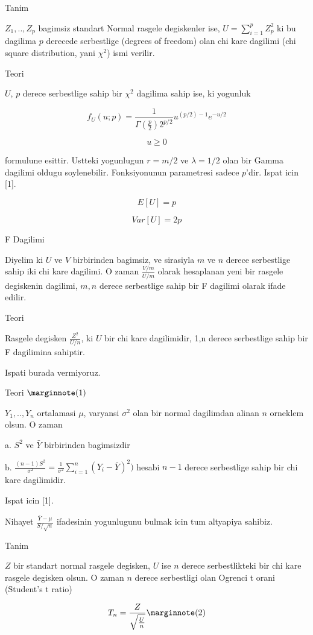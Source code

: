 \documentclass[12pt,fleqn]{article}\usepackage{../common}
\begin{document}
Tanim

$Z_1, .. , Z_p$ bagimsiz standart Normal rasgele degiskenler ise, $U = \sum
_{ i=1}^{p} Z_p^2$ 
ki bu dagilima $p$ derecede serbestlige (degrees of freedom) olan chi kare
dagilimi (chi square distribution, yani $\chi^2$) ismi verilir.

Teori

$U$, $p$ derece serbestlige sahip bir $\chi^2$ dagilima sahip ise, ki yogunluk 

$$ f_U(u;p) = \frac{ 1}{\Gamma(\frac{p}{2}) 2^{p/2}} u^{(p/2) - 1} e^{-u/2
} $$

$$ u \ge 0 $$

formulune esittir. Ustteki yogunlugun $r=m/2$ ve $\lambda=1/2$ olan bir
Gamma dagilimi oldugu soylenebilir. Fonksiyonunun parametresi sadece
$p$'dir. Ispat icin [1].

$$ E[U] = p $$

$$ Var[U] = 2p $$

F Dagilimi

Diyelim ki $U$ ve $V$ birbirinden bagimsiz, ve sirasiyla $m$ ve $n$ derece
serbestlige sahip iki chi kare dagilimi. O zaman $\frac{V/m}{U/m}$ olarak
hesaplanan yeni bir rasgele degiskenin dagilimi, $m,n$ derece serbestlige
sahip bir F dagilimi olarak ifade edilir.

Teori

Rasgele degisken $\frac{Z^2}{U/n}$, ki $U$ bir chi kare dagilimidir, 1,n
derece serbestlige sahip bir F dagilimina sahiptir. 

Ispati burada vermiyoruz.

Teori $\mlabel{1}$

$Y_1,..,Y_n$ ortalamasi $\mu$, varyansi $\sigma^2$ olan bir normal dagilimdan alinan $n$ 
orneklem olsun. O zaman 

a. $S^2$ ve $\bar{Y}$ birbirinden bagimsizdir

b. $\frac{(n-1)S^2}{\sigma^2} =
\frac{1}{\sigma^2}\sum_{i=1}^{n}(Y_i-\bar{Y})^2)$ hesabi $n-1$ derece
serbestlige sahip bir chi kare dagilimidir.

Ispat icin [1].

Nihayet  $\frac{\bar{Y}-\mu}{S / \sqrt{n}}$ ifadesinin yogunlugunu bulmak icin tum altyapiya sahibiz. 

Tanim

$Z$ bir standart normal rasgele degisken, $U$ ise $n$ derece serbestlikteki
bir chi kare rasgele degisken olsun. O zaman $n$ derece serbestligi olan
Ogrenci t orani (Student's t ratio)

$$ T_n = \frac{Z}{\sqrt{ \frac{U}{n}}} \mlabel{2} $$
\end{document}
